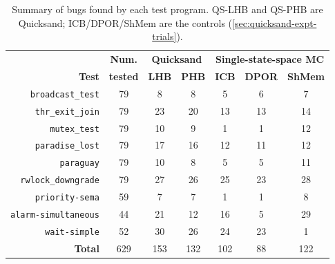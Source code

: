 \begin{table}[t]
	\begin{center}
	\small
	\begin{tabular}{r|c||c|c|c|c|c}
		& {\bf Num.} & \multicolumn{2}{c|}{\bf Quicksand} & \multicolumn{3}{c}{\bf {Single-state-space MC}}
		\\
		{\bf Test} & {\bf tested} & {\bf LHB} & {\bf PHB} & {\bf ICB} & {\bf DPOR} & {\bf ShMem}
		\\
		\hline
		{\tt broadcast\_test}    & 79  & 8   & 8   & 5   & 6   & 7   \\ %
		{\tt thr\_exit\_join}    & 79  & 23  & 20  & 13  & 13  & 14  \\ %
		{\tt mutex\_test}        & 79  & 10  & 9   & 1   & 1   & 12  \\ %
		{\tt paradise\_lost}     & 79  & 17  & 16  & 12  & 11  & 12  \\ %
		{\tt paraguay}           & 79  & 10  & 8   & 5   & 5   & 11  \\ %
		{\tt rwlock\_downgrade}  & 79  & 27  & 26  & 25  & 23  & 28  \\ %
		\hline
		{\tt priority-sema}      & 59  & 7   & 7   & 1   & 1   & 8   \\ %
		{\tt alarm-simultaneous} & 44  & 21  & 12  & 16  & 5   & 29  \\ %
		{\tt wait-simple}        & 52  & 30  & 26  & 24  & 23  & 1   \\ %
		\hline
		{\bf Total} & 629 & 153 & 132 & 102 & 88  & 122 \\ %
	\end{tabular}
	\end{center}
	\caption[Summary of bugs found by each test program.]
	{Summary of bugs
	found by each test program.
	QS-LHB and QS-PHB are Quicksand; ICB/DPOR/ShMem are the controls (\cref{sec:quicksand-expt-trials}).
	}
	\label{tab:drbugs}
\end{table}

